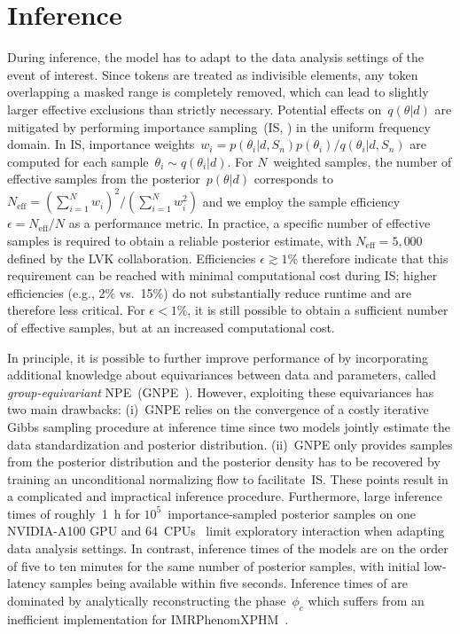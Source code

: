 \section{Inference}
During inference, the model has to adapt to the data analysis settings of the event of interest. 
Since tokens are treated as indivisible elements, any token overlapping a masked range is completely removed, which can lead to slightly larger effective exclusions than strictly necessary.
Potential effects on~$q(\theta | d)$ are mitigated by performing importance sampling~(IS, \citep{dax_is:2022}) in the uniform frequency domain.
In IS, importance weights~$w_i = p(\theta_i | d, S_{n}) p(\theta_i) / q(\theta_i | d, S_{n})$ are computed for each sample~$\theta_i \sim q(\theta_i | d)$. 
For $N$~weighted samples, the number of effective samples from the posterior~$p(\theta | d)$ corresponds to $N_\mathrm{eff} = (\sum_{i = 1}^N w_i )^2 / (\sum_{i = 1}^N w_i^2)$ and we employ the sample efficiency $\epsilon = N_\mathrm{eff} / N$ as a performance metric.
In practice, a specific number of effective samples is required to obtain a reliable posterior estimate, with $N_\mathrm{eff} = 5,000$ defined by the LVK collaboration.
Efficiencies $\epsilon \gtrsim 1\%$ therefore indicate that this requirement can be reached with minimal computational cost during IS; higher efficiencies (e.g., 2\% vs.~15\%) do not substantially reduce runtime and are therefore less critical.
For $\epsilon < 1 \%$, it is still possible to obtain a sufficient number of effective samples, but at an increased computational cost.

In principle, it is possible to further improve performance of \dingoT by incorporating additional knowledge about equivariances between data and parameters, called \textit{group-equivariant} NPE~(GNPE~\citep{dax_gnpe:2021,dax_gnpe:2021}).
However, exploiting these equivariances has two main drawbacks:
(i)~GNPE relies on the convergence of a costly iterative Gibbs sampling procedure at inference time since two models jointly estimate the data standardization and posterior distribution. 
(ii)~GNPE only provides samples from the posterior distribution and the posterior density has to be recovered by training an unconditional normalizing flow to facilitate~IS.
These points result in a complicated and impractical inference procedure.
Furthermore, large inference times of roughly~\SI{1}{\hour} for $10^5$~importance-sampled posterior samples on one NVIDIA-A100 GPU and 64~CPUs~\citep{dax_is:2022} limit exploratory interaction when adapting data analysis settings. 
In contrast, inference times of the \dingoT models are on the order of five to ten minutes for the same number of posterior samples, with initial low-latency samples being available within five seconds.
Inference times of \dingoT are dominated by analytically reconstructing the phase~$\phi_c$ which suffers from an inefficient implementation for IMRPhenomXPHM~\citep{dax_is:2022}.

